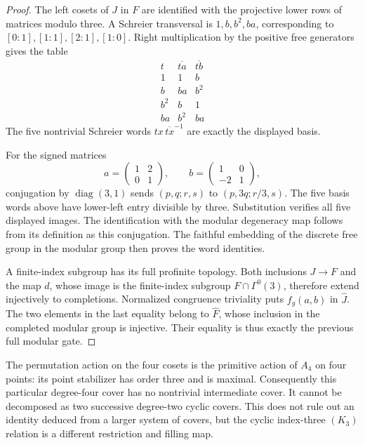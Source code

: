 \begin{proof}
The left cosets of \(J\) in \(F\) are identified with the
projective lower rows of matrices modulo three. A Schreier
transversal is \(1,b,b^2,ba\), corresponding to
\([0:1],[1:1],[2:1],[1:0]\). Right multiplication by the
positive free generators gives the table
\[
\begin{array}{c|cc}
 t&\overline{ta}&\overline{tb}\\\hline
 1&1&b\\
 b&ba&b^2\\
 b^2&b&1\\
 ba&b^2&ba
\end{array}
\]
The five nontrivial Schreier words
\(t x\,\overline{tx}^{-1}\) are exactly the displayed basis.

For the signed matrices
\[
 a=\begin{pmatrix}1&2\\0&1\end{pmatrix},\qquad
 b=\begin{pmatrix}1&0\\-2&1\end{pmatrix},
\]
conjugation by \(\operatorname{diag}(3,1)\) sends
\((p,q;r,s)\) to \((p,3q;r/3,s)\).
The five basis words above have lower-left entry divisible
by three. Substitution verifies all five displayed images.
The identification with the modular degeneracy map follows
from its definition as this conjugation. The faithful
embedding of the discrete free group in the modular group
then proves the word identities.

A finite-index subgroup has its full profinite topology.
Both inclusions \(J\to F\) and the map \(d\), whose image
is the finite-index subgroup \(F\cap\Gamma^0(3)\), therefore
extend injectively to completions. Normalized congruence
triviality puts \(f_g(a,b)\) in \(\widehat J\).
The two elements in the last equality belong to
\(\widehat F\), whose inclusion in the completed modular
group is injective. Their equality is thus exactly the
previous full modular gate.
\end{proof}

The permutation action on the four cosets is the primitive
action of \(A_4\) on four points: its point stabilizer has
order three and is maximal. Consequently this particular
degree-four cover has no nontrivial intermediate cover.
It cannot be decomposed as two successive degree-two
cyclic covers. This does not rule out an identity deduced
from a larger system of covers, but the cyclic index-three
\((K_3)\) relation is a different restriction and filling map.
